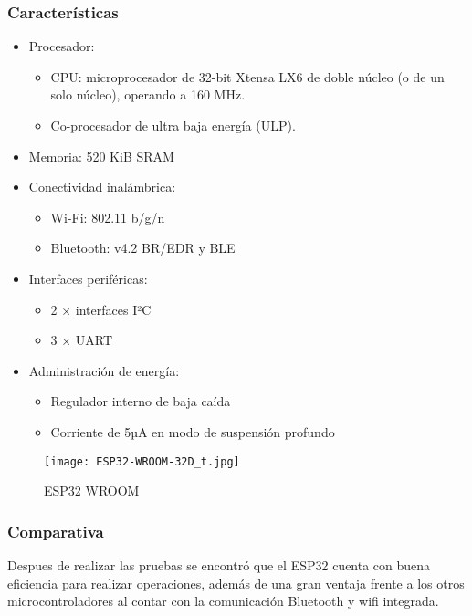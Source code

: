 \subsubsection{Características}
\begin{itemize}
    \item Procesador:
          \begin{itemize}
              \item CPU: microprocesador de 32-bit Xtensa LX6 de doble núcleo (o de un solo núcleo), operando a 160 MHz.
              \item Co-procesador de ultra baja energía (ULP).
          \end{itemize}
    \item Memoria: 520 KiB SRAM
    \item Conectividad inalámbrica:
          \begin{itemize}
              \item Wi-Fi: 802.11 b/g/n
              \item Bluetooth: v4.2 BR/EDR y BLE
          \end{itemize}
    \item Interfaces periféricas:
          \begin{itemize}
              \item 2 × interfaces I²C
              \item 3 × UART
          \end{itemize}
    \item Administración de energía:
          \begin{itemize}
              \item Regulador interno de baja caída
              \item Corriente de 5µA en modo de suspensión profundo
          \end{itemize}
\end{itemize}

\begin{figure}[htp!]
    \centering
    \texttt{[image: ESP32-WROOM-32D\_t.jpg]}
    \caption{ESP32 WROOM}
    \label{fig: esp32}
\end{figure}
\FloatBarrier

\subsubsection{Comparativa}
Despues de realizar las pruebas se encontró que el ESP32 cuenta con buena eficiencia para realizar operaciones, además de una gran ventaja frente a los otros microcontroladores al contar con la comunicación Bluetooth y wifi integrada.

